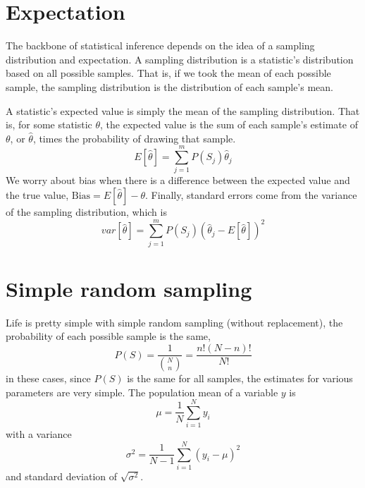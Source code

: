 \section{Expectation}

The backbone of statistical inference depends on the idea of a sampling distribution and expectation. A sampling distribution is a statistic's distribution based on all possible samples. That is, if we took the mean of each possible sample, the sampling distribution is the distribution of each sample's mean.

A statistic's expected value is simply the mean of the sampling distribution. That is, for some statistic $\theta$, the expected value is the sum of each sample's estimate of $\theta$, or $\hat{\theta}$, times the probability of drawing that sample.
\begin{equation}
E\left[\hat{\theta}\right]=\sum_{j=1}^mP\left(S_j\right)\hat{\theta}_j
\end{equation}
We worry about bias when there is a difference between the expected value and the true value, $\mbox{Bias} = E\left[\hat{\theta}\right]-\theta$. Finally, standard errors come from the variance of the sampling distribution, which is
\begin{equation}
var\left[\hat{\theta}\right] = \sum_{j=1}^mP\left(S_j\right)\left(\hat{\theta}_j-E\left[\hat{\theta}\right]\right)^2
\end{equation}

\section{Simple random sampling}
Life is pretty simple with simple random sampling (without replacement), the probability of each possible sample is the same,
\begin{equation}
P\left(S\right) = \frac{1}{{N\choose n}} = \frac{n!\left(N-n\right)!}{N!}
\end{equation}
in these cases, since $P\left(S\right)$ is the same for all samples, the estimates for various parameters are very simple. The population mean of a variable $y$ is
\begin{equation}
\mu = \frac{1}{N}\sum_{i=1}^Ny_i
\end{equation}
with a variance
\begin{equation}
\sigma^2 = \frac{1}{N-1}\sum_{i=1}^N\left(y_i-\mu\right)^2
\end{equation}
and standard deviation of $\sqrt{\sigma^2}$.

